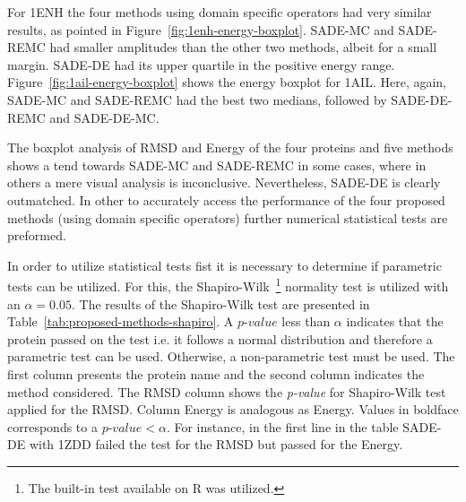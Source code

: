 For 1ENH the four methods using domain specific operators had very similar results,
as pointed in Figure~\ref{fig:1enh-energy-boxplot}. SADE-MC and SADE-REMC had smaller
amplitudes than the other two methods, albeit for a small margin. SADE-DE had its
upper quartile in the positive energy range. Figure~\ref{fig:1ail-energy-boxplot}
shows the energy boxplot for 1AIL. Here, again, SADE-MC and SADE-REMC had the best two
medians, followed by SADE-DE-REMC and SADE-DE-MC.

The boxplot analysis of \ac{RMSD} and Energy of the four proteins and five methods
shows a tend towards SADE-MC and SADE-REMC in some cases, where in others a mere
visual analysis is inconclusive. Nevertheless, SADE-DE is clearly outmatched.
In other to accurately access the performance of the four proposed methods (using
domain specific operators) further numerical statistical tests are preformed.

In order to utilize statistical tests fist it is
necessary to determine if parametric tests can be utilized. For this, the
Shapiro-Wilk~\footnote{The built-in test available on R was utilized.}
normality test is utilized with an $\alpha = 0.05$.
The results of the Shapiro-Wilk test are presented in Table~\ref{tab:proposed-methods-shapiro}.
A $p$-$value$ less than $\alpha$ indicates that the protein passed on the test i.e.
it follows a normal distribution and therefore a parametric test can be used.
Otherwise, a non-parametric test must be used. 
The first column presents the protein name
and the second column indicates the method considered. The \ac{RMSD} column shows the
\textit{p-value} for Shapiro-Wilk test applied for the \ac{RMSD}. Column Energy
is analogous as Energy. Values in boldface corresponds to a $p$-$value < \alpha$.
For instance, in the first line in the table SADE-DE with 1ZDD failed
the test for the \ac{RMSD} but passed for the Energy.



